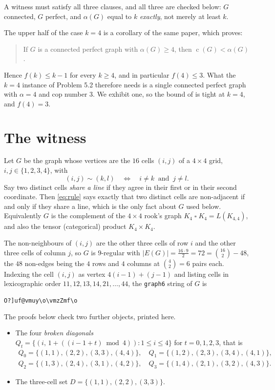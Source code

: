 \documentclass[11pt]{amsart}
\theoremstyle{definition}
\DeclareMathOperator{\cop}{c}
\newcommand{\al}{\alpha}
\newcommand{\Gwit}{G}
\begin{document}
A witness must satisfy all three clauses, and all three are checked below: $G$
connected, $G$ perfect, and $\al(G)$ equal to $k$ \emph{exactly}, not merely at
least $k$.

The upper half of the case $k=4$ is a corollary of the same paper, which
proves:

\begin{quote}
If $G$ is a connected perfect graph with $\al(G)\ge4$, then
$\cop(G)<\al(G)$.
\end{quote}

Hence $f(k)\le k-1$ for every $k\ge4$, and in particular $f(4)\le3$. What the
$k=4$ instance of Problem 5.2 therefore needs is a single connected perfect
graph with $\al=4$ and cop number $3$. We exhibit one, so the bound of
\cite{CZ} is tight at $k=4$, and $f(4)=3$.

\section{The witness}\label{sec:witness}

Let $\Gwit$ be the graph whose vertices are the $16$ cells $(i,j)$ of a
$4\times4$ grid, $i,j\in\{1,2,3,4\}$, with
\begin{equation}\label{eq:rule}
  (i,j)\sim(k,l)
  \quad\Longleftrightarrow\quad
  i\neq k \ \text{ and }\ j\neq l .
\end{equation}
Say two distinct cells \emph{share a line} if they agree in their first or in
their second coordinate. Then \eqref{eq:rule} says exactly that two distinct
cells are non-adjacent if and only if they share a line, which is the only
fact about $\Gwit$ used below. Equivalently $\Gwit$ is the complement of the
$4\times4$ rook's graph $K_4\mathbin{\square}K_4=L(K_{4,4})$, and also the
tensor (categorical) product $K_4\times K_4$.

The non-neighbours of $(i,j)$ are the other three cells of row $i$ and the
other three cells of column $j$, so $\Gwit$ is $9$-regular with
$|E(\Gwit)|=\tfrac{16\cdot9}{2}=72=\binom{16}{2}-48$, the $48$ non-edges being
the $4$ rows and $4$ columns at $\binom42=6$ pairs each. Indexing the cell
$(i,j)$ as vertex $4(i-1)+(j-1)$ and listing cells in lexicographic order
$11,12,13,14,21,\dots,44$, the \texttt{graph6} string of $\Gwit$ is
\begin{center}
\texttt{O?]uf@vmuy\textbackslash o\textbackslash vmzZmf\textbackslash o}
\end{center}
The proofs below check two further objects, printed here.
\begin{itemize}
\item The four \emph{broken diagonals}
  $Q_t=\{(i,\,1+((i-1+t)\bmod 4)):1\le i\le4\}$ for $t=0,1,2,3$, that is
  \[
    \begin{array}{l}
      Q_0=\{(1,1),(2,2),(3,3),(4,4)\},\quad
      Q_1=\{(1,2),(2,3),(3,4),(4,1)\},\\[2pt]
      Q_2=\{(1,3),(2,4),(3,1),(4,2)\},\quad
      Q_3=\{(1,4),(2,1),(3,2),(4,3)\}.
    \end{array}
  \]
\item The three-cell set $D=\{(1,1),(2,2),(3,3)\}$.
\end{itemize}
\end{document}
